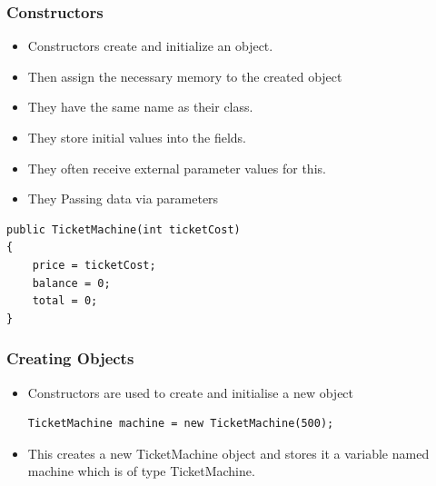 \begin{frame}[fragile]
\frametitle{Constructors}
\begin{itemize}
\item Constructors create and initialize an object.
\item Then assign the necessary memory to the created object
\item They have the same name as their class.
\item They store initial values into the fields.
\item They often receive external parameter values for this.
\item They Passing data via parameters
\end{itemize}
\pause
\codelist
\begin{lstlisting}[linewidth=7cm]
public TicketMachine(int ticketCost)‏
{
    price = ticketCost;
    balance = 0;
    total = 0;
} 
\end{lstlisting}
\end{frame}

\begin{frame}[fragile]
\frametitle{Creating Objects}
\begin{itemize}
\item Constructors are used to create and initialise a new object
\codelist
\begin{lstlisting}[linewidth=8cm]
TicketMachine machine = new TicketMachine(500);
\end{lstlisting}
\item This creates a new TicketMachine object and stores it a variable named machine which is
of type TicketMachine.
\end{itemize}
\end{frame}

